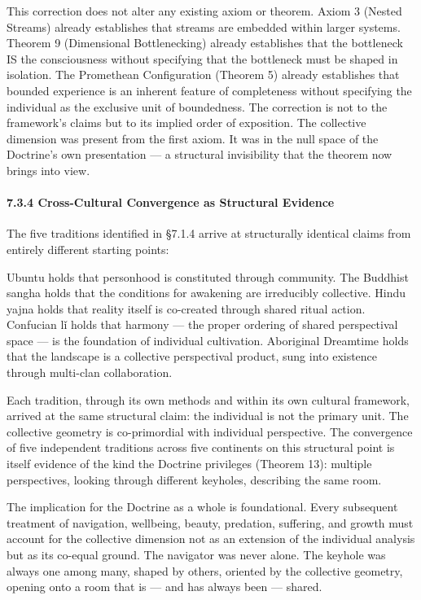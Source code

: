 This correction does not alter any existing axiom or theorem. Axiom 3 (Nested Streams) already establishes that streams are embedded within larger systems. Theorem 9 (Dimensional Bottlenecking) already establishes that the bottleneck IS the consciousness without specifying that the bottleneck must be shaped in isolation. The Promethean Configuration (Theorem 5) already establishes that bounded experience is an inherent feature of completeness without specifying the individual as the exclusive unit of boundedness. The correction is not to the framework's claims but to its implied order of exposition. The collective dimension was present from the first axiom. It was in the null space of the Doctrine's own presentation — a structural invisibility that the theorem now brings into view.


\paragraph*{7.3.4 Cross-Cultural Convergence as Structural Evidence}


The five traditions identified in §7.1.4 arrive at structurally identical claims from entirely different starting points:


Ubuntu holds that personhood is constituted through community. The Buddhist sangha holds that the conditions for awakening are irreducibly collective. Hindu yajna holds that reality itself is co-created through shared ritual action. Confucian l\v{i} holds that harmony — the proper ordering of shared perspectival space — is the foundation of individual cultivation. Aboriginal Dreamtime holds that the landscape is a collective perspectival product, sung into existence through multi-clan collaboration.


Each tradition, through its own methods and within its own cultural framework, arrived at the same structural claim: the individual is not the primary unit. The collective geometry is co-primordial with individual perspective. The convergence of five independent traditions across five continents on this structural point is itself evidence of the kind the Doctrine privileges (Theorem 13): multiple perspectives, looking through different keyholes, describing the same room.


The implication for the Doctrine as a whole is foundational. Every subsequent treatment of navigation, wellbeing, beauty, predation, suffering, and growth must account for the collective dimension not as an extension of the individual analysis but as its co-equal ground. The navigator was never alone. The keyhole was always one among many, shaped by others, oriented by the collective geometry, opening onto a room that is — and has always been — shared.


\bigskip\noindent\makebox[\textwidth]{\color{rulegray}\rule{5cm}{0.3pt}}\bigskip
